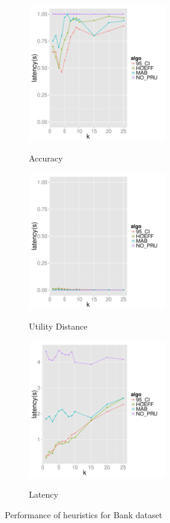 \begin{figure}[t]
	\centering
	\begin{subfigure}{0.33\linewidth}
		\centering
		{\includegraphics[width=6cm] {Images/bank_in_memory_accuracy.pdf}}
		\caption{Accuracy}
		\label{fig:bank_accuracy}
	\end{subfigure}
	\begin{subfigure}{0.33\linewidth}
		\centering
		{\includegraphics[width=6cm] {Images/bank_in_memory_utility_dist.pdf}}
		\caption{Utility Distance}
		\label{fig:bank_utility_dist}
	\end{subfigure}
	\begin{subfigure}{0.33\linewidth}
		\centering
		{\includegraphics[width=6cm] {Images/bank_in_memory_latency.pdf}}
		\caption{Latency}
		\label{fig:bank_latency}
	\end{subfigure}
	\caption{Performance of heuristics for Bank dataset}
	\label{fig:bank_perf}
\end{figure}

